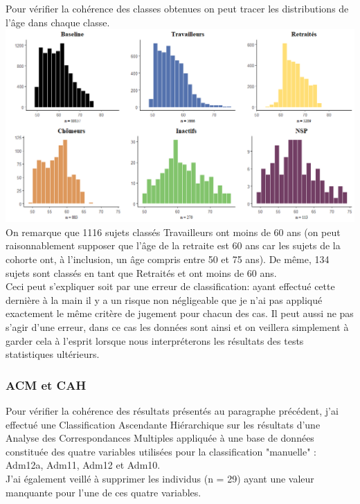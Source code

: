 \documentclass{book}
\begin{document}
\noindent
Pour vérifier la cohérence des classes obtenues on peut tracer les distributions de l'âge dans chaque classe.\\

\includegraphics[scale=.5]{plot_grid_hist_age_activproBis.png}\\
\noindent
On remarque que 1116 sujets classés Travailleurs ont moins de 60 ans (on peut raisonnablement supposer que l'âge de la retraite est 60 ans car les sujets de la cohorte ont, à l'inclusion, un âge compris entre 50 et 75 ans).
De même, 134 sujets sont classés en tant que Retraités et ont moins de 60 ans.\\
\noindent
Ceci peut s'expliquer soit par une erreur de classification: ayant effectué cette dernière à la main il y a un risque non négligeable que je n'ai pas appliqué exactement le même critère de jugement pour chacun des cas. Il peut aussi ne pas s'agir d'une erreur, dans ce cas les données sont ainsi et on veillera simplement à garder cela à l'esprit lorsque nous interpréterons les résultats des tests statistiques ultérieurs.


\subsubsection{ACM et CAH}
\noindent
Pour vérifier la cohérence des résultats présentés au paragraphe précédent, j'ai effectué une Classification Ascendante Hiérarchique sur les résultats d'une Analyse des Correspondances Multiples appliquée
à une base de données constituée des quatre variables utilisées pour la classification "manuelle" : Adm12a, Adm11, Adm12 et Adm10. \\
J'ai également veillé à supprimer les individus (n = 29) ayant une valeur manquante pour l'une de ces quatre variables. \\
\end{document}
